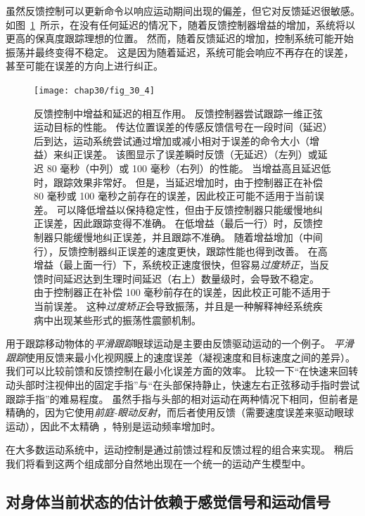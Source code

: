 虽然反馈控制可以更新命令以响应运动期间出现的偏差，但它对反馈延迟很敏感。
如图~\ref{fig:30_4}~所示，在没有任何延迟的情况下，随着反馈控制器增益的增加，系统将以更高的保真度跟踪理想的位置。
然而，随着反馈延迟的增加，控制系统可能开始振荡并最终变得不稳定。
这是因为随着延迟，系统可能会响应不再存在的误差，甚至可能在误差的方向上进行纠正。


\begin{figure}[htbp]
	\centering
	\texttt{[image: chap30/fig\_30\_4]}
	\caption{反馈控制中增益和延迟的相互作用。
		反馈控制器尝试跟踪一维正弦运动目标的性能。
		传达位置误差的传感反馈信号在一段时间（延迟）后到达，运动系统尝试通过增加或减小相对于误差的命令大小（增益）来纠正误差。
		该图显示了误差瞬时反馈（无延迟）（左列）或延迟 80 毫秒（中列）或 100 毫秒（右列）的性能。
		当增益高且延迟低时，跟踪效果非常好。
		但是，当延迟增加时，由于控制器正在补偿 80 毫秒或 100 毫秒之前存在的误差，因此校正可能不适用于当前误差。
		可以降低增益以保持稳定性，但由于反馈控制器只能缓慢地纠正误差，因此跟踪变得不准确。
		在低增益（最后一行）时，反馈控制器只能缓慢地纠正误差，并且跟踪不准确。
		随着增益增加（中间行），反馈控制器纠正误差的速度更快，跟踪性能也得到改善。
		在高增益（最上面一行）下，系统校正速度很快，但容易\textit{过度矫正}，当反馈时间延迟达到生理时间延迟（右上）数量级时，会导致不稳定。
		由于控制器正在补偿 100 毫秒前存在的误差，因此校正可能不适用于当前误差。
		这种\textit{过度矫正}会导致振荡，并且是一种解释神经系统疾病中出现某些形式的振荡性震颤机制。}
	\label{fig:30_4}
\end{figure}


用于跟踪移动物体的\textit{平滑跟踪}眼球运动是主要由反馈驱动运动的一个例子。
\textit{平滑跟踪}使用反馈来最小化视网膜上的速度误差（凝视速度和目标速度之间的差异）。
我们可以比较前馈和反馈控制在最小化误差方面的效率。
比较一下“在快速来回转动头部时注视伸出的固定手指”与“在头部保持静止，快速左右正弦移动手指时尝试跟踪手指”的难易程度。
虽然手指与头部的相对运动在两种情况下相同，但前者是精确的，因为它使用\textit{前庭-眼动反射}，而后者使用反馈（需要速度误差来驱动眼球运动），因此不太精确 ，特别是运动频率增加时。


在大多数运动系统中，运动控制是通过前馈过程和反馈过程的组合来实现。
稍后我们将看到这两个组成部分自然地出现在一个统一的运动产生模型中。



\subsection{对身体当前状态的估计依赖于感觉信号和运动信号}


